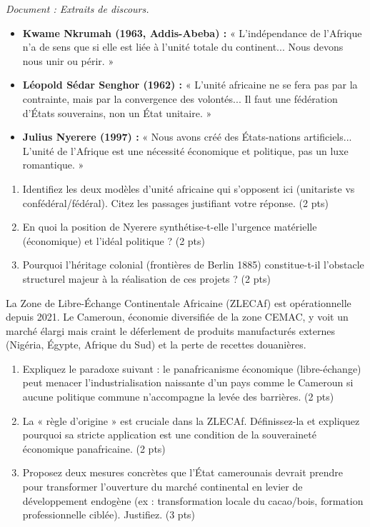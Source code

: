 \documentclass[11pt]{article}
\begin{document}
\begin{exercice}
\textit{Document : Extraits de discours.}
\begin{itemize}
    \item \textbf{Kwame Nkrumah (1963, Addis-Abeba) :} « L'indépendance de l'Afrique n'a de sens que si elle est liée à l'unité totale du continent... Nous devons nous unir ou périr. »
    \item \textbf{Léopold Sédar Senghor (1962) :} « L'unité africaine ne se fera pas par la contrainte, mais par la convergence des volontés... Il faut une fédération d'États souverains, non un État unitaire. »
    \item \textbf{Julius Nyerere (1997) :} « Nous avons créé des États-nations artificiels... L'unité de l'Afrique est une nécessité économique et politique, pas un luxe romantique. »
\end{itemize}
\begin{enumerate}
    \item Identifiez les deux modèles d'unité africaine qui s'opposent ici (unitariste vs confédéral/fédéral). Citez les passages justifiant votre réponse. (2 pts)
    \item En quoi la position de Nyerere synthétise-t-elle l'urgence matérielle (économique) et l'idéal politique ? (2 pts)
    \item Pourquoi l'héritage colonial (frontières de Berlin 1885) constitue-t-il l'obstacle structurel majeur à la réalisation de ces projets ? (2 pts)
\end{enumerate}
\end{exercice}

\begin{exercice}
La Zone de Libre-Échange Continentale Africaine (ZLECAf) est opérationnelle depuis 2021. Le Cameroun, économie diversifiée de la zone CEMAC, y voit un marché élargi mais craint le déferlement de produits manufacturés externes (Nigéria, Égypte, Afrique du Sud) et la perte de recettes douanières.
\begin{enumerate}
    \item Expliquez le paradoxe suivant : le panafricanisme économique (libre-échange) peut menacer l'industrialisation naissante d'un pays comme le Cameroun si aucune politique commune n'accompagne la levée des barrières. (2 pts)
    \item La « règle d'origine » est cruciale dans la ZLECAf. Définissez-la et expliquez pourquoi sa stricte application est une condition de la souveraineté économique panafricaine. (2 pts)
    \item Proposez deux mesures concrètes que l'État camerounais devrait prendre pour transformer l'ouverture du marché continental en levier de développement endogène (ex : transformation locale du cacao/bois, formation professionnelle ciblée). Justifiez. (3 pts)
\end{enumerate}
\end{exercice}
\end{document}
